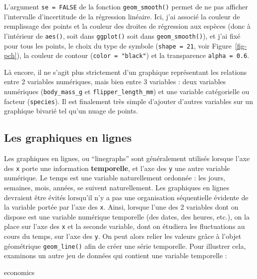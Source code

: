 \documentclass[
  letterpaper,
  DIV=11,
  numbers=noendperiod]{scrreprt}
\newenvironment{Shaded}{\begin{snugshade}}{\end{snugshade}}
\newcommand{\NormalTok}[1]{\textcolor[rgb]{0.00,0.23,0.31}{#1}}
\begin{document}
L'argument \texttt{se\ =\ FALSE} de la fonction \texttt{geom\_smooth()}
permet de ne pas afficher l'intervalle d'incertitude de la régression
linéaire. Ici, j'ai associé la couleur de remplissage des points et la
couleur des droites de régression aux espèces (donc à l'intérieur de
\texttt{aes()}, soit dans \texttt{ggplot()} soit dans
\texttt{geom\_smooth()}), et j'ai fixé pour tous les points, le choix du
type de symbole (\texttt{shape\ =\ 21}, voir Figure~\ref{fig-pch}), la
couleur de contour (\texttt{color\ =\ "black"}) et la transparence
\texttt{alpha\ =\ 0.6}.

Là encore, il ne s'agit plus strictement d'un graphique représentant les
relations entre 2 variables numériques, mais bien entre 3 variables :
deux variables numériques (\texttt{body\_mass\_g} et
\texttt{flipper\_length\_mm}) et une variable catégorielle ou facteur
(\texttt{species}). Il est finalement très simple d'ajouter d'autres
variables sur un graphique bivarié tel qu'un nuage de points.

\hypertarget{les-graphiques-en-lignes}{%
\subsection{Les graphiques en lignes}\label{les-graphiques-en-lignes}}

Les graphiques en lignes, ou ``linegraphs'' sont généralement utilisés
lorsque l'axe des \texttt{x} porte une information \textbf{temporelle},
et l'axe des \texttt{y} une autre variable numérique. Le temps est une
variable naturellement ordonnée : les jours, semaines, mois, années, se
suivent naturellement. Les graphiques en lignes devraient être évités
lorsqu'il n'y a pas une organisation séquentielle évidente de la
variable portée par l'axe des \texttt{x}. Ainsi, lorsque l'une des 2
variables dont on dispose est une variable numérique temporelle (des
dates, des heures, etc.), on la place sur l'axe des \texttt{x} et la
seconde variable, dont on étudiera les fluctuations au cours du temps,
sur l'axe des \texttt{y}. On peut alors relier les valeurs grâce à
l'objet géométrique \texttt{geom\_line()} afin de créer une série
temporelle. Pour illustrer cela, examinons un autre jeu de données qui
contient une variable temporelle :

\begin{Shaded}
\begin{Highlighting}[]
\NormalTok{economics}
\end{Highlighting}
\end{Shaded}
\end{document}
